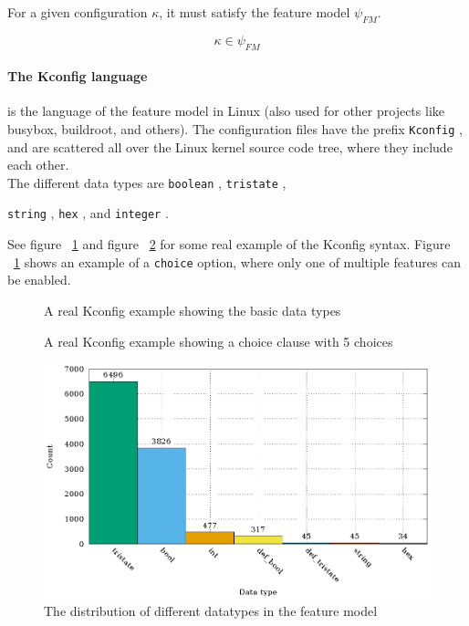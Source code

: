 \documentclass[a4paper,11pt]{article}
\newcommand{\textcode}[1]{
    \fboxsep=1pt
    \texttt{\colorbox{gray!20}{#1}}
}
\newcommand{\figa}{
    \begin{figure}[!htpb]
    \centering
}
\newcommand{\figb}[2]{
    \caption{#1}
    \label{#2}
    \end{figure}
}
\begin{document}
For a given configuration $\kappa$, it must satisfy the feature model $\psi_{FM}$.

\begin{equation}
    \kappa \in \psi_{FM}
\end{equation}

\paragraph{The Kconfig language} is the language of the feature model in Linux 
(also used for other projects like busybox, buildroot, and others).
The configuration files have the prefix \textcode{Kconfig}, and are 
scattered all over the Linux kernel source code tree, where they include each 
other.
\\

The different data types are \textcode{boolean}, \textcode{tristate}, 
\textcode{string}, \textcode{hex}, and \textcode{integer}.

See figure ~\ref{kconfigchoice} and figure ~\ref{kconfigtypes} for some real 
example of the Kconfig syntax. Figure ~\ref{kconfigchoice} shows an example of 
a \textcode{choice} option, where only one of multiple features 
can be enabled. 

\figa
    
\figb{A real Kconfig example showing the basic data types}{kconfigchoice}

\figa
    
\figb{A real Kconfig example showing a choice clause with 5 
    choices}{kconfigtypes}

\figa
    \includegraphics{plots/datatypestats.eps}
\figb{The distribution of different datatypes in the feature 
    model}{datatypesdistribution}
\end{document}
